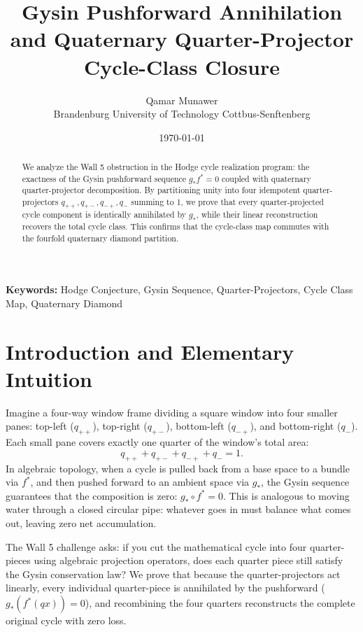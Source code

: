 \documentclass[11pt,a4paper]{article}
\title{\textbf{Gysin Pushforward Annihilation and Quaternary Quarter-Projector Cycle-Class Closure}}
\author{Qamar Munawer \\ Brandenburg University of Technology Cottbus-Senftenberg}
\date{\today}
\theoremstyle{definition}
\begin{document}
\maketitle

\begin{abstract}
We analyze the Wall 5 obstruction in the Hodge cycle realization program: the exactness of the Gysin pushforward sequence $g_* f^* = 0$ coupled with quaternary quarter-projector decomposition. By partitioning unity into four idempotent quarter-projectors $q_{++}, q_{+-}, q_{-+}, q_{ - }$ summing to 1, we prove that every quarter-projected cycle component is identically annihilated by $g_*$, while their linear reconstruction recovers the total cycle class. This confirms that the cycle-class map commutes with the fourfold quaternary diamond partition.
\end{abstract}

\vspace{1em}
\noindent\textbf{Keywords:} Hodge Conjecture, Gysin Sequence, Quarter-Projectors, Cycle Class Map, Quaternary Diamond

\section{Introduction and Elementary Intuition}

Imagine a four-way window frame dividing a square window into four smaller panes: top-left ($q_{++}$), top-right ($q_{+-}$), bottom-left ($q_{-+}$), and bottom-right ($q_{ - }$). Each small pane covers exactly one quarter of the window's total area:
\begin{equation}
q_{++} + q_{+-} + q_{-+} + q_{ - } = 1.
\end{equation}
In algebraic topology, when a cycle is pulled back from a base space to a bundle via $f^*$, and then pushed forward to an ambient space via $g_*$, the Gysin sequence guarantees that the composition is zero: $g_* \circ f^* = 0$. This is analogous to moving water through a closed circular pipe: whatever goes in must balance what comes out, leaving zero net accumulation.

The Wall 5 challenge asks: if you cut the mathematical cycle into four quarter-pieces using algebraic projection operators, does each quarter piece still satisfy the Gysin conservation law? We prove that because the quarter-projectors act linearly, every individual quarter-piece is annihilated by the pushforward ($g_*(f^*(q x)) = 0$), and recombining the four quarters reconstructs the complete original cycle with zero loss.
\end{document}
